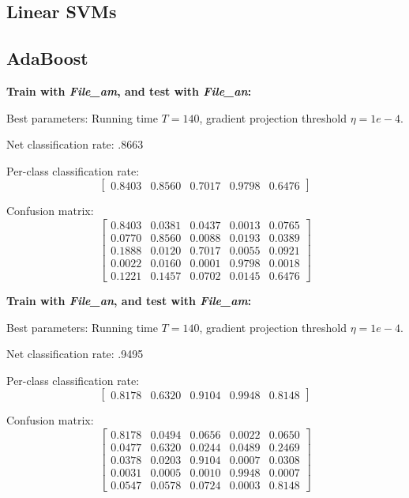 \documentclass[letterpaper]{article}
\begin{document}
\subsection*{Linear SVMs}

\subsection*{AdaBoost}

\textbf{Train with \textit{File\_am}, and test with \textit{File\_an}:}

Best parameters: Running time $T=140$, gradient projection threshold $\eta=1e-4$.

Net classification rate: .8663

Per-class classification rate: 
$$\begin{bmatrix} 0.8403  &  0.8560   & 0.7017 &   0.9798  &  0.6476\end{bmatrix}$$

Confusion matrix:
$$\begin{bmatrix}
    0.8403 &   0.0381  &  0.0437  &  0.0013  &  0.0765\\
    0.0770  &  0.8560   & 0.0088   & 0.0193  &  0.0389\\
    0.1888  &  0.0120   & 0.7017   & 0.0055  &  0.0921\\
    0.0022  &  0.0160   & 0.0001   & 0.9798  &  0.0018\\
    0.1221  &  0.1457   & 0.0702   & 0.0145  &  0.6476
\end{bmatrix}$$

\textbf{Train with \textit{File\_an}, and test with \textit{File\_am}:}

Best parameters: Running time $T=140$, gradient projection threshold $\eta=1e-4$.

Net classification rate: .9495

Per-class classification rate: 
$$\begin{bmatrix}0.8178 &   0.6320 &   0.9104  &  0.9948  &  0.8148\end{bmatrix}$$

Confusion matrix:
$$\begin{bmatrix}
0.8178 &   0.0494   & 0.0656 &   0.0022  &  0.0650\\
    0.0477 &   0.6320  &  0.0244 &   0.0489 &   0.2469\\
    0.0378 &   0.0203 &   0.9104  &  0.0007  &  0.0308\\
    0.0031  &  0.0005 &   0.0010  &  0.9948  &  0.0007\\
    0.0547  &  0.0578   & 0.0724  &  0.0003  &  0.8148
\end{bmatrix}$$
\end{document}
